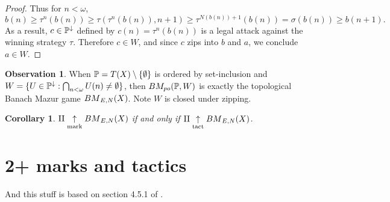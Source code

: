 \documentclass[11pt]{article}
\theoremstyle{plain}
\newtheorem{corollary}[theorem]{Corollary}
\newtheorem{proposition}[theorem]{Proposition}
\theoremstyle{definition}
\newtheorem{observation}[theorem]{Observation}
\theoremstyle{remark}
\theoremstyle{plain}
\theoremstyle{definition}
\theoremstyle{remark}
\newcommand{\bmPoGame}[2]{BM_{po}(#1,#2)}
\begin{document}
\begin{proof}
    Thus for \(n<\omega\),
    \[
      b(n)
        \geq
      \tau^{n}(b(n))
        \geq
      \tau(\tau^{n}(b(n)),n+1)
        \geq
      \tau^{N(b(n))+1}(b(n))
        =
      \sigma(b(n))
        \geq
      b(n+1)
    .\]
    As a result, \(c\in\mathbb{P}^\downarrow\) defined by \(c(n)=\tau^n(b(n))\)
    is a legal attack against the winning strategy \(\tau\). Therefore
    \(c\in W\), and since \(c\) zips into \(b\) and \(a\), we conclude
    \(a\in W\).
  \end{proof}

  \begin{observation}
    When \(\mathbb{P}=T(X)\setminus\{\emptyset\}\) is ordered by set-inclusion
    and \(W=\{U\in\mathbb{P}^\downarrow:\bigcap_{n<\omega}U(n)\not=\emptyset\}\),
    then \(\bmPoGame{\mb P}{W}\) is exactly the topological Banach Mazur game
    \({BM}_{E,N}(X)\). Note \(W\) is closed under zipping.
  \end{observation}

  \begin{corollary}
  \(\mathrm{II}\underset{\mathrm{mark}}{\uparrow}{BM}_{E,N}(X)\) if and only if
  \(\mathrm{II}\underset{\mathrm{tact}}{\uparrow}{BM}_{E,N}(X)\).
  \end{corollary}


  \section*{2+ marks and tactics}

  And this stuff is based on section 4.5.1 of \cite{bartoszynski1993covering}.

\end{document}
